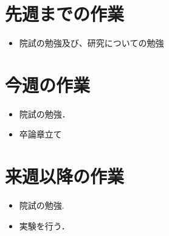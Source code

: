 \section{先週までの作業}
\begin{itemize}
\item 院試の勉強及び、研究についての勉強
\end{itemize}

\section{今週の作業}
\begin{itemize}
\item 院試の勉強．
 \item 卒論章立て
\end{itemize}

\section{来週以降の作業}
\begin{itemize}
\item 院試の勉強.
  \item  実験を行う．
\end{itemize}


